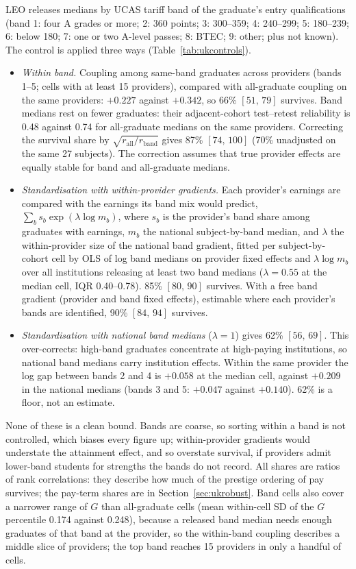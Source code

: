 \documentclass[11pt]{article}
\newcommand{\ci}[2]{$[#1,\allowbreak\,#2]$}
\begin{document}
LEO releases medians by UCAS tariff band of the graduate's entry qualifications (band 1: four A grades or more;
2: 360 points; 3: 300--359; 4: 240--299; 5: 180--239; 6: below 180; 7: one or two A-level passes; 8: BTEC; 9: other;
plus not known). The control is applied three ways (Table~\ref{tab:ukcontrols}).
\begin{itemize}
\item \emph{Within band.} Coupling among same-band graduates across providers (bands 1--5; cells with at least
15 providers), compared with all-graduate coupling on the same providers: $+0.227$ against $+0.342$, so 66\%
\ci{51}{79} survives. Band medians rest on fewer graduates: their adjacent-cohort test--retest reliability is 0.48
against 0.74 for all-graduate medians on the same providers. Correcting the survival share by
$\sqrt{r_{\text{all}}/r_{\text{band}}}$ gives 87\% \ci{74}{100} (70\% unadjusted on the same 27 subjects). The
correction assumes that true provider effects are equally stable for band and all-graduate medians.
\item \emph{Standardisation with within-provider gradients.} Each provider's earnings are compared with the
earnings its band mix would predict, $\sum_b s_b\exp(\lambda\log m_b)$, where $s_b$ is the provider's band share
among graduates with earnings, $m_b$ the national subject-by-band median, and $\lambda$ the within-provider size
of the national band gradient, fitted per subject-by-cohort cell by OLS of log band medians on provider fixed
effects and $\lambda\log m_b$ over all institutions releasing at least two band medians ($\lambda=0.55$ at the
median cell, IQR 0.40--0.78). 85\% \ci{80}{90} survives. With a free band gradient (provider and band fixed
effects), estimable where each provider's bands are identified, 90\% \ci{84}{94} survives.
\item \emph{Standardisation with national band medians} ($\lambda=1$) gives 62\% \ci{56}{69}. This over-corrects:
high-band graduates concentrate at high-paying institutions, so national band medians carry institution effects.
Within the same provider the log gap between bands 2 and 4 is $+0.058$ at the median cell, against $+0.209$ in the
national medians (bands 3 and 5: $+0.047$ against $+0.140$). 62\% is a floor, not an estimate.
\end{itemize}
None of these is a clean bound. Bands are coarse, so sorting within a band is not controlled, which biases every
figure up; within-provider gradients would understate the attainment effect, and so overstate survival, if
providers admit lower-band students for strengths the bands do not record. All shares are ratios of rank
correlations: they describe how much of the prestige ordering of pay survives; the pay-term shares are in
Section~\ref{sec:ukrobust}. Band cells also cover a narrower range of $G$ than all-graduate cells (mean within-cell SD
of the $G$ percentile 0.174 against 0.248), because a released band median needs enough graduates of that band at
the provider, so the within-band coupling describes a middle slice of providers; the top band reaches 15 providers
in only a handful of cells.
\end{document}

